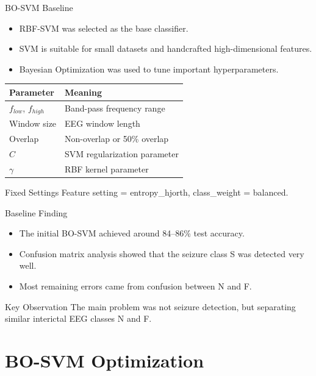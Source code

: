 \documentclass[10pt,aspectratio=169]{beamer}
\begin{document}
\begin{frame}{BO-SVM Baseline}
  \begin{itemize}
    \item RBF-SVM was selected as the base classifier.
    \item SVM is suitable for small datasets and handcrafted high-dimensional features.
    \item Bayesian Optimization was used to tune important hyperparameters.
  \end{itemize}

  \begin{table}
    \centering
    \small
    \begin{tabular}{ll}
      \toprule
      Parameter & Meaning \\
      \midrule
      $f_{low}$, $f_{high}$ & Band-pass frequency range \\
      Window size & EEG window length \\
      Overlap & Non-overlap or 50\% overlap \\
      $C$ & SVM regularization parameter \\
      $\gamma$ & RBF kernel parameter \\
      \bottomrule
    \end{tabular}
  \end{table}

  \begin{block}{Fixed Settings}
    Feature setting = entropy\_hjorth, class\_weight = balanced.
  \end{block}
\end{frame}

\begin{frame}{Baseline Finding}
  \begin{itemize}
    \item The initial BO-SVM achieved around 84--86\% test accuracy.
    \item Confusion matrix analysis showed that the seizure class S was detected very well.
    \item Most remaining errors came from confusion between N and F.
  \end{itemize}

  \begin{block}{Key Observation}
    The main problem was not seizure detection, but separating similar interictal EEG classes N and F.
  \end{block}
\end{frame}

\section{BO-SVM Optimization}
\end{document}
